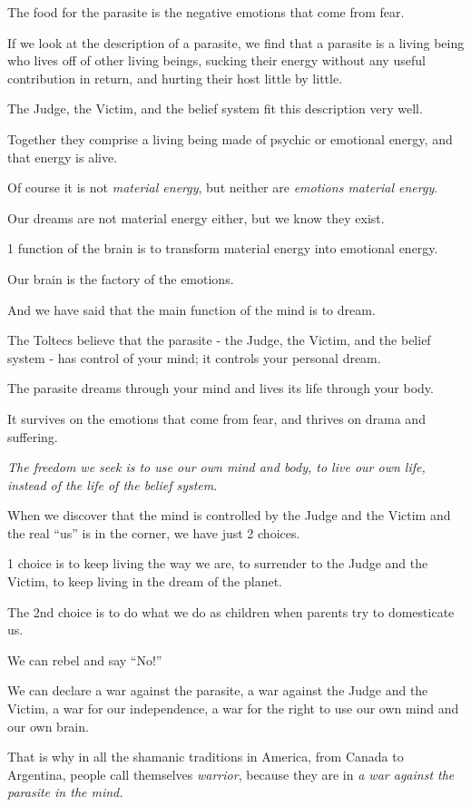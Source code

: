\documentclass{article}
\numberwithin{equation}{section}
\begin{document}
The food for the parasite is the negative emotions that come from fear.

%
If we look at the description of a parasite, we find that a parasite is a living being who lives off of other living beings, sucking their energy without any useful contribution in return, and hurting their host little by little.

The Judge, the Victim, and the belief system fit this description very well.

Together they comprise a living being made of psychic or emotional energy, and that energy is alive.

Of course it is not \textit{material energy}, but neither are \textit{emotions material energy}.

Our dreams are not material energy either, but we know they exist.

%
1 function of the brain is to transform material energy into emotional energy.

Our brain is the factory of the emotions.

And we have said that the main function of the mind is to dream.

The Toltecs believe that the parasite - the Judge, the Victim, and the belief system - has control of your mind; it controls your personal dream.

The parasite dreams through your mind and lives its life through your body.

It survives on the emotions that come from fear, and thrives on drama and suffering.

%
\textit{The freedom we seek is to use our own mind and body, to live our own life, instead of the life of the belief system}.

When we discover that the mind is controlled by the Judge and the Victim and the real ``us'' is in the corner, we have just 2 choices.

1 choice is to keep living the way we are, to surrender to the Judge and the Victim, to keep living in the dream of the planet.

The 2nd choice is to do what we do as children when parents try to domesticate us.

We can rebel and say ``No!''

We can declare a war against the parasite, a war against the Judge and the Victim, a war for our independence, a war for the right to use our own mind and our own brain.

%
That is why in all the shamanic traditions in America, from Canada to Argentina, people call themselves \textit{warrior}, because they are in \textit{a war against the parasite in the mind.}
\end{document}
